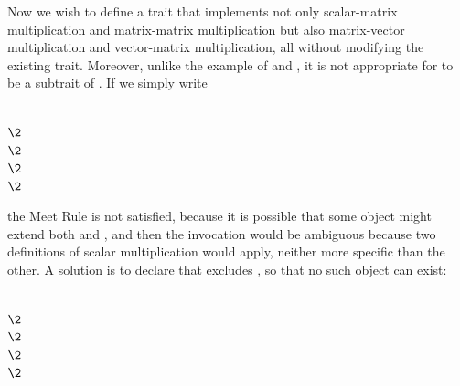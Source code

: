 Now we wish to define a  trait that implements not only
scalar-matrix multiplication and
matrix-matrix multiplication but also matrix-vector multiplication and vector-matrix multiplication,
all without modifying the existing  trait.  Moreover,
unlike the example of  and , it is not
appropriate for  to be a subtrait of .
If we simply write
\begin{codeexamplesize}
\begin{tabbing}
 \\
\(\2\) \\
\(\2\) \\
\(\2\) \\
\(\2\) \\
\end{tabbing}
\end{codeexamplesize}
the Meet Rule is not satisfied, because it is possible that some object  might extend
both  and , and then the invocation  would be ambiguous
because two definitions of scalar multiplication would apply, neither more specific than
the other.  A solution is to declare that  excludes ,
so that no such object can exist:
\begin{codeexamplesize}
\begin{tabbing}
 \\
\(\2\) \\
\(\2\) \\
\(\2\) \\
\(\2\) \\
\end{tabbing}
\end{codeexamplesize}

